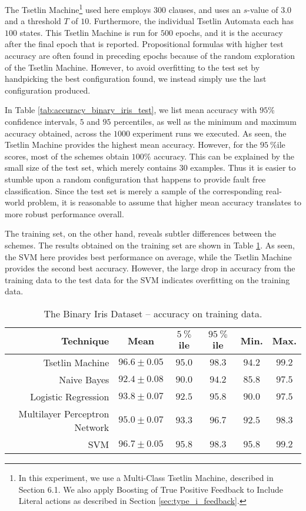 \documentclass[11pt,a4paper]{article}
\begin{document}
The Tsetlin Machine\footnote{In this experiment, we use a Multi-Class Tsetlin Machine, described in Section 6.1. We also apply Boosting of True  Positive  Feedback  to  Include  Literal  actions as described in Section \ref{sec:type_i_feedback}.} used here employs $300$ clauses, and uses an $s$-value of $3.0$ and a threshold $T$ of $10$. Furthermore, the individual Tsetlin Automata each has $100$ states. This Tsetlin Machine is run for $500$ epochs, and it is the accuracy after the final epoch that is reported. 
Propositional formulas with higher test accuracy are often found in preceding epochs because of the random exploration of the Tsetlin Machine. However, to avoid overfitting to the test set by handpicking the best configuration found, we instead simply use the last configuration produced.

In Table \ref{tab:accuracy_binary_iris_test}, we list mean accuracy with $95\%$ confidence intervals, $5$ and $95$ percentiles, as well as the minimum and maximum accuracy obtained, across the $1000$ experiment runs we executed. As seen, the Tsetlin Machine provides the highest mean accuracy. However, for the $95~\%$ile scores, most of the schemes obtain $100\%$ accuracy. This can be explained by the small size of the test set, which merely contains 30 examples. Thus it is easier to stumble upon a random configuration that happens to provide fault free classification. Since the test set is merely a sample of the corresponding real-world problem, it is reasonable to assume that higher mean accuracy translates to more robust performance overall.

The training set, on the other hand, reveals subtler differences between the schemes. The results obtained on the training set are shown in Table \ref{tab:accuracy_binary_iris_training}.  As seen, the SVM here provides best performance on average, while the Tsetlin Machine provides the second best accuracy. However, the large drop in accuracy from the training data to the test data for the SVM indicates overfitting on the training data.

\begin{table}[!bh]
    \centering
    \begin{tabular}{r||c|c|c|c|c}
         \bf Technique&\bf Mean&\bf $5~\%$ile &\bf $95~\%$ile&\bf Min.&\bf Max.\\
         \hline
    Tsetlin Machine&$96.6 \pm 0.05$&$95.0$&$98.3$&$94.2$&$99.2$\\
    Naive Bayes&$92.4 \pm 0.08$&$90.0$&$94.2$&$85.8$&$97.5$\\
    Logistic Regression&$93.8 \pm 0.07$&$92.5$&$95.8$&$90.0$&$97.5$\\
    Multilayer Perceptron Network&$95.0 \pm 0.07$&$93.3$&$96.7$&$92.5$&$98.3$\\
    SVM&$96.7 \pm 0.05$&$95.8$&$98.3$&$95.8$&$99.2$
    \end{tabular}
    \caption{The Binary Iris Dataset -- accuracy on training data.}
    \label{tab:accuracy_binary_iris_training}
\end{table}
\end{document}
